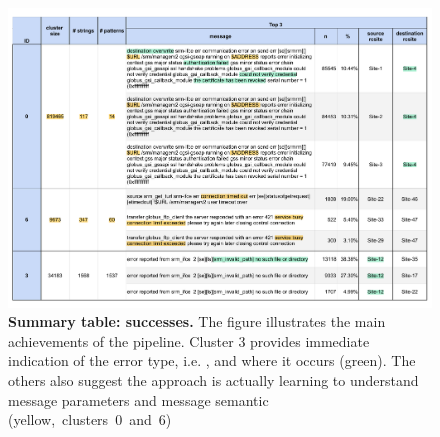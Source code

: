 \begin{landscape}
\begin{figure}
    \centering
    \includegraphics[width=\linewidth]{figures/510_results/cluster-summary-successes_annotated_printed.pdf}
    \caption{\textbf{Summary table: successes.}
    The figure illustrates the main achievements of the pipeline. 
    Cluster 3 provides immediate indication of the error type, i.e. , and where it occurs (green).
    The others also suggest the approach is actually learning to understand message parameters and message semantic \mbox{(yellow, clusters 0 and 6)}
    }
    \label{fig:cluster_summary:successes}
\end{figure}
\end{landscape}


